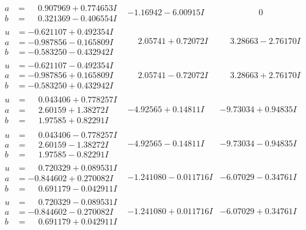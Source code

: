\documentclass[1p]{elsarticle_modified}
\theoremstyle{definition}
\begin{document}
$$\begin{array}{c|c|c}
\begin{aligned}
a &= \phantom{-}0.907969 + 0.774653 I \\
b &= \phantom{-}0.321369 - 0.406554 I\end{aligned}
 & -1.16942 - 6.00915 I & \phantom{-0.000000 } 0 \\ \hline\begin{aligned}
u &= -0.621107 + 0.492354 I \\
a &= -0.987856 - 0.165809 I \\
b &= -0.583250 - 0.432942 I\end{aligned}
 & \phantom{-}2.05741 + 0.72072 I & \phantom{-}3.28663 - 2.76170 I \\ \hline\begin{aligned}
u &= -0.621107 - 0.492354 I \\
a &= -0.987856 + 0.165809 I \\
b &= -0.583250 + 0.432942 I\end{aligned}
 & \phantom{-}2.05741 - 0.72072 I & \phantom{-}3.28663 + 2.76170 I \\ \hline\begin{aligned}
u &= \phantom{-}0.043406 + 0.778257 I \\
a &= \phantom{-}2.60159 + 1.38272 I \\
b &= \phantom{-}1.97585 + 0.82291 I\end{aligned}
 & -4.92565 + 0.14811 I & -9.73034 + 0.94835 I \\ \hline\begin{aligned}
u &= \phantom{-}0.043406 - 0.778257 I \\
a &= \phantom{-}2.60159 - 1.38272 I \\
b &= \phantom{-}1.97585 - 0.82291 I\end{aligned}
 & -4.92565 - 0.14811 I & -9.73034 - 0.94835 I \\ \hline\begin{aligned}
u &= \phantom{-}0.720329 + 0.089531 I \\
a &= -0.844602 + 0.270082 I \\
b &= \phantom{-}0.691179 - 0.042911 I\end{aligned}
 & -1.241080 - 0.011716 I & -6.07029 - 0.34761 I \\ \hline\begin{aligned}
u &= \phantom{-}0.720329 - 0.089531 I \\
a &= -0.844602 - 0.270082 I \\
b &= \phantom{-}0.691179 + 0.042911 I\end{aligned}
 & -1.241080 + 0.011716 I & -6.07029 + 0.34761 I \\ \hline\begin{aligned}

\end{aligned}
\end{array}$$
\end{document}
